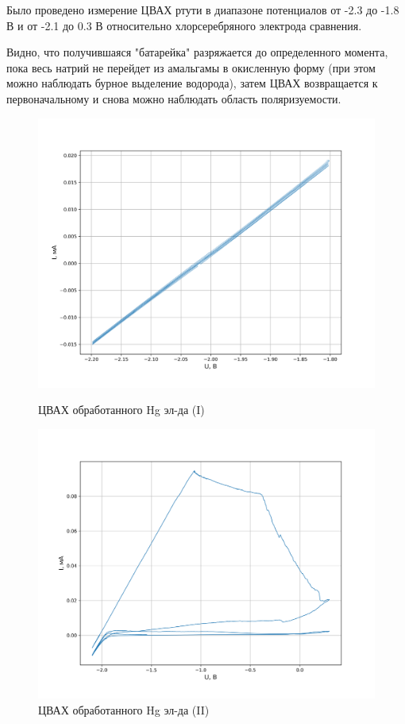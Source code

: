 \documentclass[a4paper, 12pt]{article}
\begin{document}
Было проведено измерение ЦВАХ ртути в диапазоне потенциалов от -2.3 до -1.8 В и от -2.1 до 0.3 В относительно хлорсеребряного электрода сравнения.

Видно, что получившаяся "батарейка" разряжается до определенного момента, пока весь натрий не перейдет из амальгамы в окисленную форму (при этом можно наблюдать бурное выделение водорода), затем ЦВАХ возвращается к первоначальному и снова можно наблюдать область поляризуемости.

\begin{figure}[h!] %
\begin{center}
\begin{minipage}[h]{0.49\linewidth}
\includegraphics[width=1\linewidth]{C.png}
\caption{ЦВАХ обработанного Hg эл-да (I)} %
\label{ris:experimoriginal} %
\end{minipage}
\hfill 
\begin{minipage}[h]{0.49\linewidth}
\includegraphics[width=1\linewidth]{D.png}
\caption{ЦВАХ обработанного Hg эл-да (II)}
\label{ris:experimcoded}
\end{minipage}
\end{center}
\end{figure}
\end{document}
